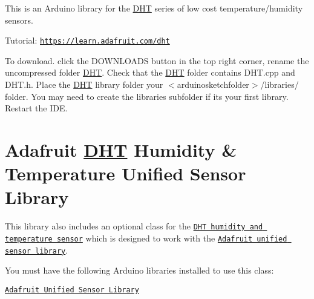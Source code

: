 This is an Arduino library for the \hyperlink{class_d_h_t}{D\+HT} series of low cost temperature/humidity sensors.

Tutorial\+: \href{https://learn.adafruit.com/dht}{\tt https\+://learn.\+adafruit.\+com/dht}

To download. click the D\+O\+W\+N\+L\+O\+A\+DS button in the top right corner, rename the uncompressed folder \hyperlink{class_d_h_t}{D\+HT}. Check that the \hyperlink{class_d_h_t}{D\+HT} folder contains D\+H\+T.\+cpp and D\+H\+T.\+h. Place the \hyperlink{class_d_h_t}{D\+HT} library folder your $<$arduinosketchfolder$>$/libraries/ folder. You may need to create the libraries subfolder if its your first library. Restart the I\+DE.

\section*{Adafruit \hyperlink{class_d_h_t}{D\+HT} Humidity \& Temperature Unified Sensor Library}

This library also includes an optional class for the \href{https://learn.adafruit.com/dht/overview}{\tt D\+HT humidity and temperature sensor} which is designed to work with the \href{https://learn.adafruit.com/using-the-adafruit-unified-sensor-driver/introduction}{\tt Adafruit unified sensor library}.

You must have the following Arduino libraries installed to use this class\+:


\begin{DoxyItemize}
\item \href{https://github.com/adafruit/Adafruit_Sensor}{\tt Adafruit Unified Sensor Library} 
\end{DoxyItemize}